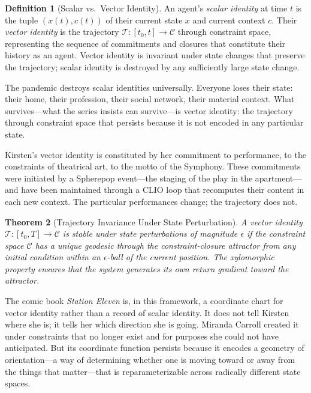 \documentclass[12pt, oneside]{article}
\theoremstyle{plain}
\newtheorem{theorem}{Theorem}[section]
\theoremstyle{definition}
\newtheorem{definition}[theorem]{Definition}
\theoremstyle{remark}
\newcommand{\Traj}{\mathcal{T}}
\newcommand{\CC}{\mathcal{C}}
\begin{document}
\begin{definition}[Scalar vs.\ Vector Identity]
An agent's \emph{scalar identity} at time $t$ is the tuple
$(x(t), c(t))$ of their current state $x$ and current context $c$.
Their \emph{vector identity} is the trajectory $\Traj : [t_0, t]
\to \CC$ through constraint space, representing the sequence of
commitments and closures that constitute their history as an agent.
Vector identity is invariant under state changes that preserve
the trajectory; scalar identity is destroyed by any sufficiently
large state change.
\end{definition}

The pandemic destroys scalar identities universally. Everyone loses
their state: their home, their profession, their social network,
their material context. What survives---what the series insists
can survive---is vector identity: the trajectory through constraint
space that persists because it is not encoded in any particular
state.

Kirsten's vector identity is constituted by her commitment to
performance, to the constraints of theatrical art, to the motto
of the Symphony. These commitments were initiated by a
Spherepop event---the staging of the play in the apartment---and
have been maintained through a CLIO loop that recomputes their
content in each new context. The particular performances change;
the trajectory does not.

\begin{theorem}[Trajectory Invariance Under State Perturbation]
\label{thm:trajectory-invariance}
A vector identity $\Traj : [t_0, T] \to \CC$ is stable under
state perturbations of magnitude $\epsilon$ if the constraint
space $\CC$ has a unique geodesic through the constraint-closure
attractor from any initial condition within an $\epsilon$-ball of
the current position. The xylomorphic property ensures that the
system generates its own return gradient toward the attractor.
\end{theorem}

The comic book \textit{Station Eleven} is, in this framework, a
coordinate chart for vector identity rather than a record of scalar
identity. It does not tell Kirsten where she is; it tells her which
direction she is going. Miranda Carroll created it under constraints
that no longer exist and for purposes she could not have anticipated.
But its coordinate function persists because it encodes a geometry
of orientation---a way of determining whether one is moving toward
or away from the things that matter---that is reparameterizable
across radically different state spaces.
\end{document}
